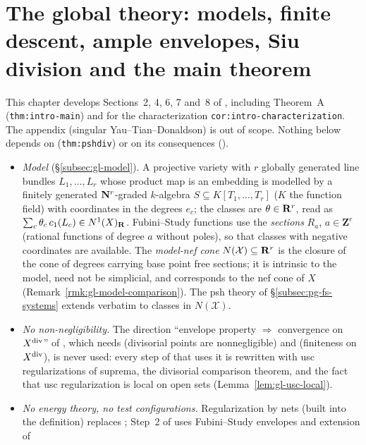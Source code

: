 \section{The global theory: models, finite descent, ample envelopes, Siu division and the main theorem}\label{sec:global}

This chapter develops Sections~2, 4, 6, 7 and~8 of \cite{FHX}, including Theorem~A
(\texttt{thm:intro-main}) and for the characterization \texttt{cor:intro-characterization}. The appendix
(singular Yau--Tian--Donaldson) is out of scope. Nothing below depends on \cite[Theorem~6.21]{BJ22}
(\texttt{thm:pshdiv}) or on its consequences (\cite[Corollaries~6.22, 6.41, Theorems~6.31, 6.35, 6.40]{BJ22}).

\begin{itemize}
\item \emph{Model} (\S\ref{subsec:gl-model}). A projective variety with $r$ globally generated line bundles
$L_1,\dots,L_r$ whose product map is an embedding is modelled by a finitely generated $\mathbf{N}^r$-graded $k$-algebra
$S\subseteq K[T_1,\dots,T_r]$ ($K$ the function field) with coordinates in the degrees $e_c$; the
classes are $\theta\in\mathbf{R}^r$, read as $\sum_c\theta_c\,c_1(L_c)\in N^1(X)_{\mathbf{R}}$. Fubini--Study functions use
the \emph{sections} $R_a$, $a\in\mathbf Z^r$ (rational functions of degree $a$ without poles), so that classes
with negative coordinates are available. The \emph{model-nef cone} $N(\mathcal X)\subseteq\mathbf{R}^r$ is the closure of
the cone of degrees carrying base point free sections; it is intrinsic to the model, need not be simplicial,
and corresponds to the nef cone of $X$ (Remark~\ref{rmk:gl-model-comparison}). The psh theory of
\S\ref{subsec:pg-fs-systems} extends verbatim to classes in $N(\mathcal X)$.
\item \emph{No non-negligibility.} The direction ``envelope property $\Rightarrow$ convergence on $X^{\mathrm{div}}$'' of
\cite[Proposition~2.4]{FHX}, which needs \cite[Theorem~5.6]{BJ22} (divisorial points are nonnegligible) and
\cite[Corollary~4.17]{BJ22} (finiteness on $X^{\mathrm{div}}$), is never used: every step of \cite{FHX} that uses it is
rewritten with usc regularizations of suprema, the divisorial comparison theorem, and the fact that usc
regularization is local on open sets (Lemma~\ref{lem:gl-usc-local}).
\item \emph{No energy theory, no test configurations.} Regularization by nets (built into the definition) replaces
\cite[Corollary~12.18]{BJ22}; Step~2 of \cite[Theorem~6.1]{FHX} uses Fubini--Study envelopes and extension of

\end{itemize}

